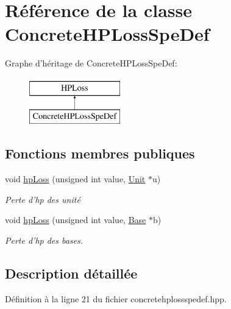 \hypertarget{classConcreteHPLossSpeDef}{\section{Référence de la classe Concrete\+H\+P\+Loss\+Spe\+Def}
\label{classConcreteHPLossSpeDef}
}
Graphe d'héritage de Concrete\+H\+P\+Loss\+Spe\+Def\+:\begin{figure}[H]
\begin{center}
\leavevmode
\includegraphics[height=2.000000cm]{classConcreteHPLossSpeDef}
\end{center}
\end{figure}
\subsection*{Fonctions membres publiques}
\begin{DoxyCompactItemize}
\item 
void \hyperlink{classConcreteHPLossSpeDef_ad62272f839de14217c84688bd2fa5aba}{hp\+Loss} (unsigned int value, \hyperlink{classUnit}{Unit} $\ast$u)
\begin{DoxyCompactList}\small\item\em Perte d'hp des unité \end{DoxyCompactList}\item 
void \hyperlink{classConcreteHPLossSpeDef_ad7b1e1fa122742674fe53e89a6c4b261}{hp\+Loss} (unsigned int value, \hyperlink{classBase}{Base} $\ast$b)
\begin{DoxyCompactList}\small\item\em Perte d'hp des bases. \end{DoxyCompactList}\end{DoxyCompactItemize}


\subsection{Description détaillée}


Définition à la ligne 21 du fichier concretehplossspedef.\+hpp.



